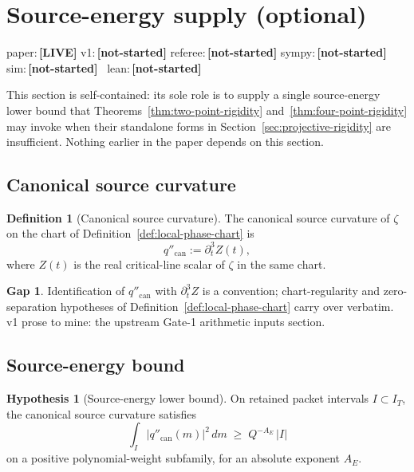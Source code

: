 \documentclass[11pt,a4paper]{amsart}
\numberwithin{equation}{section}
\theoremstyle{plain}
\theoremstyle{definition}
\newtheorem{definition}[theorem]{Definition}
\newtheorem{hypothesis}[theorem]{Hypothesis}
\newcommand{\can}{\mathrm{can}}
\newtheorem{wip}[theorem]{Gap}
\newcommand{\status}[1]{\textbf{\scriptsize[#1]}}
\newcommand{\statuspaper}[1]{\textsf{\footnotesize paper:}\,\status{#1}}
\newcommand{\statusmig}[1]{\textsf{\footnotesize v1:}\,\status{#1}}
\newcommand{\statusreferee}[1]{\textsf{\footnotesize referee:}\,\status{#1}}
\newcommand{\statussympy}[2][\relax]{%
  \textsf{\footnotesize sympy:}\,\status{#2}%
  \ifx\relax#1\else\,\textsf{\scriptsize\texttt{#1}}\fi%
}
\newcommand{\statussim}[2][\relax]{%
  \textsf{\footnotesize sim:}\,\status{#2}%
  \ifx\relax#1\else\,\textsf{\scriptsize\texttt{#1}}\fi%
}
\newcommand{\statuslean}[2][\relax]{%
  \textsf{\footnotesize lean:}\,\status{#2}%
  \ifx\relax#1\else\,\textsf{\scriptsize\texttt{#1}}\fi%
}
\begin{document}
\section{Source-energy supply (optional)}
\label{sec:source-energy-supply}
\statuspaper{LIVE}\quad
\statusmig{not-started}\quad
\statusreferee{not-started}\quad
\statussympy{not-started}\quad
\statussim{not-started}\quad
\statuslean{not-started}
\par\medskip

This section is self-contained: its sole role is to supply a single
source-energy lower bound that
Theorems~\ref{thm:two-point-rigidity}
and~\ref{thm:four-point-rigidity} may invoke when their standalone
forms in
Section~\ref{sec:projective-rigidity}
are insufficient.  Nothing earlier in the paper depends on this
section.

\subsection{Canonical source curvature}
\label{subsec:canonical-source-curvature}

\begin{definition}[Canonical source curvature]
\label{def:canonical-source-curvature}
The canonical source curvature of \(\zeta\) on the chart of
Definition~\ref{def:local-phase-chart} is
\begin{equation}
\label{eq:canonical-source}
q''_\can := \partial_t^3 Z(t),
\end{equation}
where \(Z(t)\) is the real critical-line scalar of \(\zeta\) in the same chart.
\end{definition}

\begin{wip}\label{rem:wip-canonical-source-curvature}
Identification of \(q''_\can\) with \(\partial_t^3 Z\) is a
convention; chart-regularity and zero-separation hypotheses of
Definition~\ref{def:local-phase-chart} carry over verbatim.  v1 prose to
mine: the upstream Gate-1 arithmetic inputs section.
\end{wip}

\subsection{Source-energy bound}
\label{subsec:source-energy-bound}

\begin{hypothesis}[Source-energy lower bound]
\label{hyp:source-energy-bound}
On retained packet intervals \(I\subset I_T\), the canonical source
curvature satisfies
\begin{equation}
\label{eq:source-energy}
\int_I |q''_\can(m)|^2\,dm \;\ge\; Q^{-A_E}\,|I|
\end{equation}
on a positive polynomial-weight subfamily, for an absolute exponent
\(A_E\).
\end{hypothesis}
\end{document}
